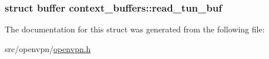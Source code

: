 \subsubsection[{read\+\_\+tun\+\_\+buf}]{\setlength{\rightskip}{0pt plus 5cm}struct {\bf buffer} context\+\_\+buffers\+::read\+\_\+tun\+\_\+buf}\label{structcontext__buffers_aa03e7433c540b45f5e427527739d888c}


The documentation for this struct was generated from the following file\+:\begin{DoxyCompactItemize}
\item 
src/openvpn/\hyperlink{openvpn_8h}{openvpn.\+h}\end{DoxyCompactItemize}
